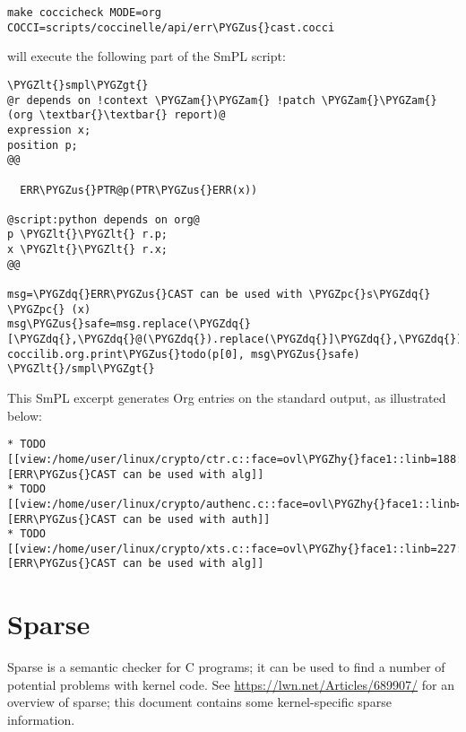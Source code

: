 \documentclass[a4paper,8pt,english]{sphinxmanual}
\def\PYGZus{\char`\_}
\def\PYGZam{\char`\&}
\def\PYGZlt{\char`\<}
\def\PYGZgt{\char`\>}
\def\PYGZpc{\char`\%}
\def\PYGZhy{\char`\-}
\def\PYGZdq{\char`\"}
\begin{document}
\begin{Verbatim}[commandchars=\\\{\}]
make coccicheck MODE=org COCCI=scripts/coccinelle/api/err\PYGZus{}cast.cocci
\end{Verbatim}

will execute the following part of the SmPL script:

\begin{Verbatim}[commandchars=\\\{\}]
\PYGZlt{}smpl\PYGZgt{}
@r depends on !context \PYGZam{}\PYGZam{} !patch \PYGZam{}\PYGZam{} (org \textbar{}\textbar{} report)@
expression x;
position p;
@@

  ERR\PYGZus{}PTR@p(PTR\PYGZus{}ERR(x))

@script:python depends on org@
p \PYGZlt{}\PYGZlt{} r.p;
x \PYGZlt{}\PYGZlt{} r.x;
@@

msg=\PYGZdq{}ERR\PYGZus{}CAST can be used with \PYGZpc{}s\PYGZdq{} \PYGZpc{} (x)
msg\PYGZus{}safe=msg.replace(\PYGZdq{}[\PYGZdq{},\PYGZdq{}@(\PYGZdq{}).replace(\PYGZdq{}]\PYGZdq{},\PYGZdq{})\PYGZdq{})
coccilib.org.print\PYGZus{}todo(p[0], msg\PYGZus{}safe)
\PYGZlt{}/smpl\PYGZgt{}
\end{Verbatim}

This SmPL excerpt generates Org entries on the standard output, as
illustrated below:

\begin{Verbatim}[commandchars=\\\{\}]
* TODO [[view:/home/user/linux/crypto/ctr.c::face=ovl\PYGZhy{}face1::linb=188::colb=9::cole=16][ERR\PYGZus{}CAST can be used with alg]]
* TODO [[view:/home/user/linux/crypto/authenc.c::face=ovl\PYGZhy{}face1::linb=619::colb=9::cole=16][ERR\PYGZus{}CAST can be used with auth]]
* TODO [[view:/home/user/linux/crypto/xts.c::face=ovl\PYGZhy{}face1::linb=227::colb=9::cole=16][ERR\PYGZus{}CAST can be used with alg]]
\end{Verbatim}


\chapter{Sparse}
\label{dev-tools/sparse::doc}\label{dev-tools/sparse:sparse}
Sparse is a semantic checker for C programs; it can be used to find a
number of potential problems with kernel code.  See
\href{https://lwn.net/Articles/689907/}{https://lwn.net/Articles/689907/} for an overview of sparse; this document
contains some kernel-specific sparse information.
\end{document}
